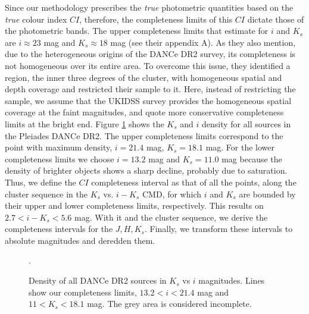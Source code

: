 Since our methodology prescribes the \emph{true} photometric quantities based on the \emph{true} colour index $CI$, therefore, the completeness limits of this $CI$ dictate those of the photometric bands. The upper completeness limits that \citet{Bouy2015} estimate for $i$ and $K_s$ are $i\approx23$ mag and $K_s\approx18$ mag (see their appendix A). As they also mention, due to the heterogeneous origins of the DANCe DR2 survey, its completeness is not homogeneous over its entire area. To overcome this issue, they identified a region, the inner three degrees of the cluster, with homogeneous spatial and depth coverage and restricted their sample to it. Here, instead of restricting the sample, we assume that the UKIDSS survey provides the homogeneous spatial coverage at the faint magnitudes, and quote more conservative completeness limits at the bright end. Figure \ref{figure:completeness} shows the $K_s$ and $i$ density  for all sources in the Pleiades DANCe DR2. The upper completeness limits correspond to the point with maximum density, $i=21.4$ mag, $K_s=18.1$ mag. For the lower completeness limits we choose $i=13.2$ mag and $K_s=11.0$ mag because the density of brighter objects shows a sharp decline, probably due to saturation.
Thus, we define the $CI$ completeness interval as that of all the points, along the cluster sequence in the $K_s$ vs. $i-K_s$ CMD, for which $i$ and $K_s$ are bounded by their upper and lower completeness limits, respectively. This results on $2.7<i-K_s<5.6$ mag. With it and the cluster sequence, we derive the completeness intervals for the $J,H,K_s$. Finally, we transform these intervals to absolute magnitudes and deredden them. 
\begin{figure}[htbp]
\begin{center}
\caption{Density of all DANCe DR2 sources in $K_s$ vs $i$ magnitudes. Lines show our completeness limits, $13.2<i<21.4$ mag and $11<K_s<18.1$ mag. The grey area is considered incomplete.}
\label{figure:completeness}.
\end{center}
\end{figure}


